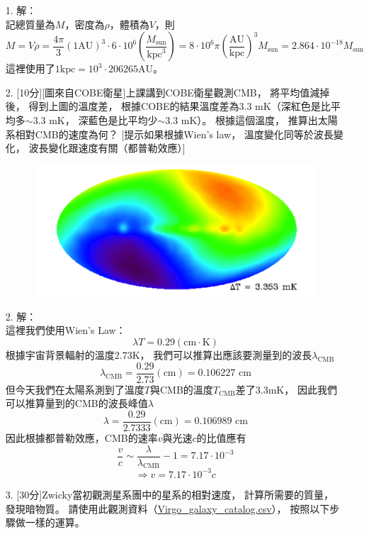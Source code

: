 \documentclass{article}
\theoremstyle{definition}
\begin{document}
\begin{enumerate}
	\item[1.] 解：\\
		記總質量為$M$，密度為$\rho$，體積為$V$，則
		\[
			M = V \rho = \frac{4 \pi}{3} (1 \text{AU})^3 \cdot 6 \cdot 10^6 (\frac{M_{\text{sun}}}{\text{kpc}^3}) = 8 \cdot 10^6 \pi \left( \frac{\text{AU}}{\text{kpc}} \right)^3 M_{\text{sun}} = 2.864 \cdot 10^{-18} M_{\text{sun}}
		\]
		這裡使用了$1 \text{kpc} = 10^3 \cdot 206265 \text{AU}$。

	\item[2.] [10分][圖來自COBE衛星]上課講到COBE衛星觀測CMB，
		將平均值減掉後，
		得到上圖的溫度差，
		根據COBE的結果溫度差為3.3 mK（深紅色是比平均多$\sim 3.3$ mK，
		深藍色是比平均少$\sim 3.3$ mK）。
		根據這個溫度，
		推算出太陽系相對CMB的速度為何？
		[提示如果根據Wien's law，
		溫度變化同等於波長變化，
		波長變化跟速度有關（都普勒效應）]

		\begin{figure}[h]
			\centering
			\includegraphics[scale = 0.3]{hw2-2.png}
			\caption{}
			\label{fig2}
		\end{figure}

	\item[2.] 解：\\
		這裡我們使用Wien's Law：
		\[
			\lambda T = 0.29 (\text{cm} \cdot \text{K})
		\]
		根據宇宙背景輻射的溫度$2.73$K，
		我們可以推算出應該要測量到的波長$\lambda_{\text{CMB}}$
		\[
			\lambda_{\text{CMB}} = \frac{0.29}{2.73} (\text{cm}) = 0.106227 \text{ cm}
		\]
		但今天我們在太陽系測到了溫度$T$與CMB的溫度$T_{\text{CMB}}$差了3.3mK，
		因此我們可以推算量到的CMB的波長峰值$\lambda$
		\[
			\lambda = \frac{0.29}{2.7333} (\text{cm}) = 0.106989 \text{ cm}
		\]
		因此根據都普勒效應，CMB的速率$v$與光速$c$的比值應有
		\[
			\frac{v}{c} \sim \frac{\lambda}{\lambda_{\text{CMB}}} - 1 = 7.17 \cdot 10^{-3}
		\]
		\[
			\Rightarrow v = 7.17 \cdot 10^{-3} c
		\]

	\item[3.] [30分]Zwicky當初觀測星系團中的星系的相對速度，
		計算所需要的質量，
		發現暗物質。
		請使用此觀測資料（\href{https://www.dropbox.com/s/6z5jypo7tj2ulen/Virgo_galaxy_catalog.csv?dl=0}{Virgo\_galaxy\_catalog.csv}），
		按照以下步驟做一樣的運算。


\end{enumerate}
\end{document}
